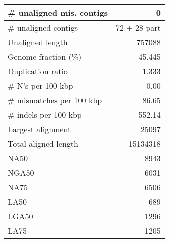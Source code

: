 \documentclass[12pt,a4paper]{article}
\begin{document}
\begin{table}[ht]
\begin{center}
\begin{tabular}{|l*{1}{|r}|}
\# unaligned mis. contigs & 0 \\ \hline
\# unaligned contigs & 72 + 28 part \\ \hline
Unaligned length & 757088 \\ \hline
Genome fraction (\%) & 45.445 \\ \hline
Duplication ratio & 1.333 \\ \hline
\# N's per 100 kbp & 0.00 \\ \hline
\# mismatches per 100 kbp & 86.65 \\ \hline
\# indels per 100 kbp & 552.14 \\ \hline
Largest alignment & 25097 \\ \hline
Total aligned length & 15134318 \\ \hline
NA50 & 8943 \\ \hline
NGA50 & 6031 \\ \hline
NA75 & 6506 \\ \hline
LA50 & 689 \\ \hline
LGA50 & 1296 \\ \hline
LA75 & 1205 \\ \hline
\end{tabular}
\end{center}
\end{table}
\end{document}

